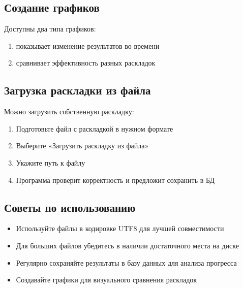 \documentclass[a4paper,11pt,russian,openany,oneside]{sphinxmanual}
\begin{document}
\subsection{Создание графиков}
\label{\detokenize{usage:id15}}
\sphinxAtStartPar
Доступны два типа графиков:
\begin{enumerate}
%
\item {} 
\sphinxAtStartPar
{} \sphinxhyphen{} показывает изменение результатов во времени

\item {} 
\sphinxAtStartPar
{} \sphinxhyphen{} сравнивает эффективность разных раскладок

\end{enumerate}


\subsection{Загрузка раскладки из файла}
\label{\detokenize{usage:id16}}
\sphinxAtStartPar
Можно загрузить собственную раскладку:
\begin{enumerate}
%
\item {} 
\sphinxAtStartPar
Подготовьте файл с раскладкой в нужном формате

\item {} 
\sphinxAtStartPar
Выберите «Загрузить раскладку из файла»

\item {} 
\sphinxAtStartPar
Укажите путь к файлу

\item {} 
\sphinxAtStartPar
Программа проверит корректность и предложит сохранить в БД

\end{enumerate}


\subsection{Советы по использованию}
\label{\detokenize{usage:id17}}\begin{itemize}
\item {} 
\sphinxAtStartPar
Используйте файлы в кодировке UTF\sphinxhyphen{}8 для лучшей совместимости

\item {} 
\sphinxAtStartPar
Для больших файлов убедитесь в наличии достаточного места на диске

\item {} 
\sphinxAtStartPar
Регулярно сохраняйте результаты в базу данных для анализа прогресса

\item {} 
\sphinxAtStartPar
Создавайте графики для визуального сравнения раскладок

\end{itemize}
\end{document}
